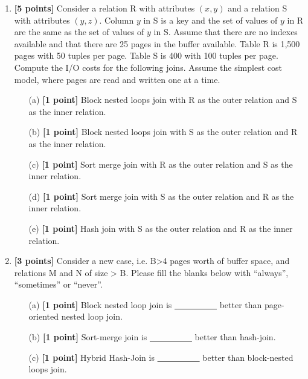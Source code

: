 \documentclass[10pt]{article}
\begin{document}
\begin{enumerate}
	\item \textbf{[5 points]}
	      Consider a relation R with attributes $(x,y)$ and a relation S with attributes $(y, z)$.
	      Column $y$ in S is a key and the set of values of $y$ in R are the same as the set of values of $y$ in S.
	      Assume that there are no indexes available and that there are 25 pages in the buffer available.
	      Table R is 1,500 pages with 50 tuples per page. Table S is 400 with 100 tuples per page.
	      Compute the I/O costs for the following joins. Assume the simplest cost model, where pages are read and written one at a time.
	      \begin{itemize}
		      \item[(a)] \textbf{[1 point]} Block nested loops join with R as the outer relation and S as the inner relation.
		      \item[(b)] \textbf{[1 point]} Block nested loops join with S as the outer relation and R as the inner relation.
		      \item[(c)] \textbf{[1 point]} Sort merge join with R as the outer relation and S as the inner relation.
		      \item[(d)] \textbf{[1 point]} Sort merge join with S as the outer relation and R as the inner relation.
		      \item[(e)] \textbf{[1 point]} Hash join with S as the outer relation and R as the inner relation.
	      \end{itemize}

	\item \textbf{[3 points]}
	      Consider a new case, i.e. B>4 pages worth of buffer space, and relations M and N of size > B.
	      Please fill the blanks below with ``always'', ``sometimes'' or ``never''.
	      \begin{itemize}
		      \item[(a)] \textbf{[1 point]} Block nested loop join is \underline{\ \ \ \ \ \ \ \ \ \ } better than page-oriented nested loop join.
		      \item[(b)] \textbf{[1 point]} Sort-merge join is \underline{\ \ \ \ \ \ \ \ \ \ } better than hash-join.
		      \item[(c)] \textbf{[1 point]} Hybrid Hash-Join is \underline{\ \ \ \ \ \ \ \ \ \ } better than block-nested loops join.
	      \end{itemize}
\end{enumerate}

\end{document}
